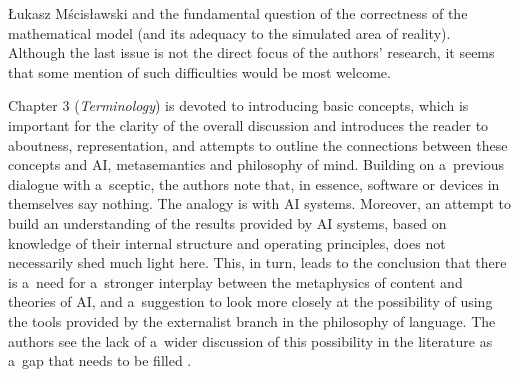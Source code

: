 \begin{newrevengenv}{Łukasz Mścisławski}
\parencite[e.g.][]{spence_stoic_2021} %
 and the fundamental question of the correctness of the mathematical model (and its adequacy to the simulated area of reality). Although the last issue is not the direct focus of the authors' research, it seems that some mention of such difficulties would be most welcome.

Chapter 3 (\textit{Terminology}) is devoted to introducing basic concepts, which is important for the clarity of the overall discussion and introduces the reader to aboutness, representation, and attempts to outline the connections between these concepts and AI, metasemantics and philosophy of mind. Building on a~previous dialogue with a~sceptic, the authors note that, in essence, software or devices in themselves say nothing. The analogy is with AI systems. Moreover, an attempt to build an understanding of the results provided by AI systems, based on knowledge of their internal structure and operating principles, does not necessarily shed much light here. This, in turn, leads to the conclusion that there is a~need for a~stronger interplay between the metaphysics of content and theories of AI, and a~suggestion to look more closely at the possibility of using the tools provided by the externalist branch in the philosophy of language. The authors see the lack of a~wider discussion of this possibility in the literature as a~gap that needs to be filled
\parencite[pp.53--58; cf.][]{krzanowski_meta-ontology_2022}.%


\end{newrevengenv}
